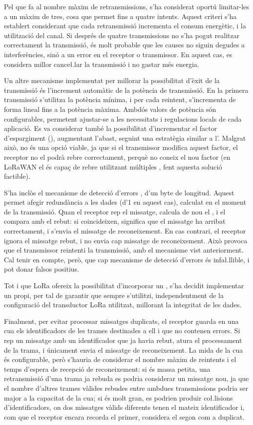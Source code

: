 \documentclass{tfgitic}[2024/07/01]
\begin{document}
Pel que fa al nombre màxim de retransmissions, s'ha considerat oportú limitar-les a un màxim de tres, cosa que permet fins a quatre intents. Aquest criteri s'ha establert considerant que cada retransmissió incrementa el consum energètic, i la utilització del canal. Si després de quatre transmissions no s'ha pogut realitzar correctament la transmissió, és molt probable que les causes no siguin degudes a interferències, sinó a un error en el receptor o transmissor. En aquest cas, es considera millor cance\l.lar la transmissió i no gastar més energia.

Un altre mecanisme implementat per millorar la possibilitat d'èxit de la transmissió és l'increment automàtic de la potència de transmissió. En la primera transmissió s'utilitza la potència mínima, i per cada reintent, s'incrementa de forma lineal fins a la potència màxima. Ambdós valors de potència són configurables, permetent ajustar-se a les necessitats i regulacions locals de cada aplicació. Es va considerar també la possibilitat d'incrementar el factor d'espargiment (), augmentant l'abast, seguint una estratègia similar a l'. Malgrat això, no és una opció viable, ja que si el transmissor modifica aquest factor, el receptor no el podrà rebre correctament, perquè no coneix el nou factor (en LoRaWAN el  és capaç de rebre utilitzant múltiples , fent aquesta solució factible). 

S'ha inclòs el mecanisme de detecció d'errors , d'un byte de longitud. Aquest permet afegir redundància a les dades (d'\SI{1}{\byte} en aquest cas), calculat en el moment de la transmissió. Quan el receptor rep el missatge, calcula de nou el , i el compara amb el rebut: si coincideixen, significa que el missatge ha arribat correctament, i s'envia el missatge de reconeixement. En cas contrari, el receptor ignora el missatge rebut, i no envia cap missatge de reconeixement. Això provoca que el transmissor reintenti la transmissió, amb el mecanisme vist anteriorment. Cal tenir en compte, però, que cap mecanisme de detecció d'errors és infa\l.llible, i pot donar falsos positius.  

Tot i que LoRa ofereix la possibilitat d'incorporar un , s'ha decidit implementar un  propi, per tal de garantir que sempre s'utilitzi, independentment de la configuració del transductor LoRa utilitzat, millorant la integritat de les dades. 

Finalment, per evitar processar missatges duplicats, el receptor guarda en una cua els identificadors de les trames destinades a ell i que no contenen errors. Si rep un missatge amb un identificador que ja havia rebut, atura el processament de la trama, i únicament envia el missatge de reconeixement. La mida de la cua és configurable, però s'hauria de considerar el nombre màxim de reintents i el temps d'espera de recepció de reconeixement: si és massa petita, una retransmissió d'una trama ja rebuda es podria considerar un missatge nou, ja que el nombre d'altres trames vàlides rebudes entre ambdues transmissions podria ser major a la capacitat de la cua; si és molt gran, es podrien produir co\l.lisions d'identificadors, on dos missatges vàlids diferents tenen el mateix identificador i, com que el receptor encara recorda el primer, considera el segon com a duplicat. 
\end{document}
